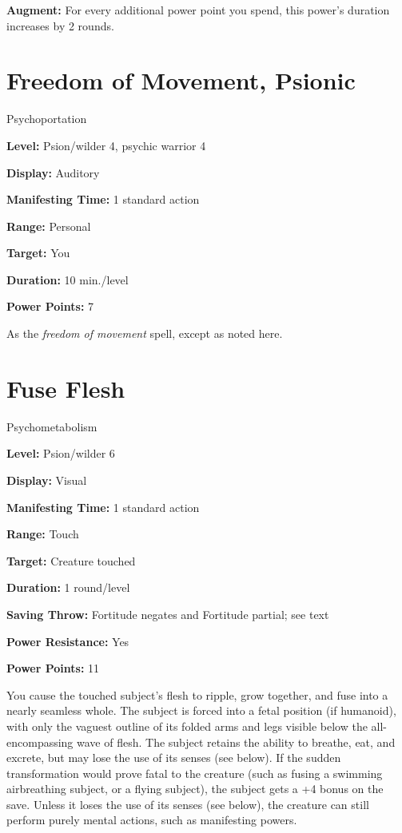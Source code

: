 \documentclass{article}
\begin{document}
\textbf{Augment:} For every additional power point you spend, this power's duration 
increases by 2 rounds. 

\vspace{12pt}
\section*{Freedom of Movement, Psionic}

Psychoportation

\textbf{Level:} Psion/wilder 4, psychic warrior 4

\textbf{Display:} Auditory

\textbf{Manifesting Time:} 1 standard action

\textbf{Range:} Personal

\textbf{Target:} You

\textbf{Duration:} 10 min./level

\textbf{Power Points:} 7

As the \textit{freedom of movement }spell, except as noted here.

\vspace{12pt}
\section*{Fuse Flesh}

Psychometabolism

\textbf{Level:} Psion/wilder 6

\textbf{Display:} Visual

\textbf{Manifesting Time:} 1 standard action

\textbf{Range:} Touch

\textbf{Target:} Creature touched

\textbf{Duration:} 1 round/level

\textbf{Saving Throw:} Fortitude negates and Fortitude partial; see text

\textbf{Power Resistance:} Yes

\textbf{Power Points:} 11

You cause the touched subject's flesh to ripple, grow together, and fuse into a 
nearly seamless whole. The subject is forced into a fetal position (if humanoid), 
with only the vaguest outline of its folded arms and legs visible below the all-encompassing 
wave of flesh. The subject retains the ability to breathe, eat, and excrete, but 
may lose the use of its senses (see below). If the sudden transformation would 
prove fatal to the creature (such as fusing a swimming airbreathing subject, or 
a flying subject), the subject gets a +4 bonus on the save. Unless it loses the 
use of its senses (see below), the creature can still perform purely mental actions, 
such as manifesting powers.
\end{document}
